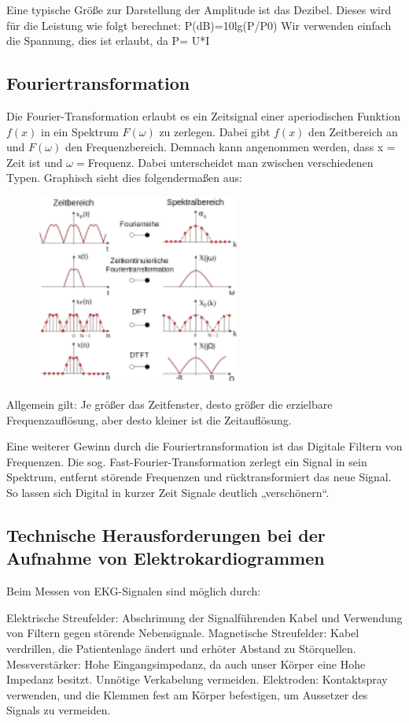 Eine typische Größe zur Darstellung der Amplitude ist das Dezibel. Dieses wird für die Leistung wie folgt berechnet:
P(dB)=10lg(P/P0)
Wir verwenden einfach die Spannung, dies ist erlaubt, da P= U*I

\subsection{Fouriertransformation }
Die Fourier-Transformation erlaubt es ein Zeitsignal einer aperiodischen Funktion $f(x)$ in ein Spektrum $F(\omega)$ zu zerlegen. Dabei gibt $f(x)$ den Zeitbereich an und $F(\omega)$ den Frequenzbereich. Demnach kann angenommen werden, dass x = Zeit ist und $\omega= $Frequenz. 
Dabei unterscheidet man zwischen verschiedenen Typen. Graphisch sieht dies folgendermaßen aus:
\begin{figure}[H]
     \centering
     \includegraphics[width=0.6\textwidth]{Abb/fourier.pdf}
\end{figure}
Allgemein gilt: Je größer das Zeitfenster, desto größer die erzielbare Frequenzauflösung, aber desto kleiner ist die Zeitauflösung.

Eine weiterer Gewinn durch die Fouriertransformation ist das Digitale Filtern von Frequenzen. Die sog. Fast-Fourier-Transformation zerlegt ein Signal in sein Spektrum, entfernt störende Frequenzen und rücktransformiert das neue Signal. So lassen sich Digital in kurzer Zeit Signale deutlich „verschönern“.

\subsection{Technische Herausforderungen bei der Aufnahme von Elektrokardiogrammen}
Beim Messen von EKG-Signalen sind möglich durch:

Elektrische Streufelder:
  Abschrimung der Signalführenden Kabel und Verwendung von Filtern gegen störende Nebensignale.
Magnetische Streufelder:
  Kabel verdrillen, die Patientenlage ändert und erhöter Abstand zu Störquellen.
Messverstärker:
  Hohe Eingangsimpedanz, da auch unser Körper eine Hohe Impedanz besitzt. Unnötige Verkabelung vermeiden.
Elektroden:
  Kontaktspray verwenden, und die Klemmen fest am Körper befestigen, um Aussetzer des Signals zu vermeiden.
